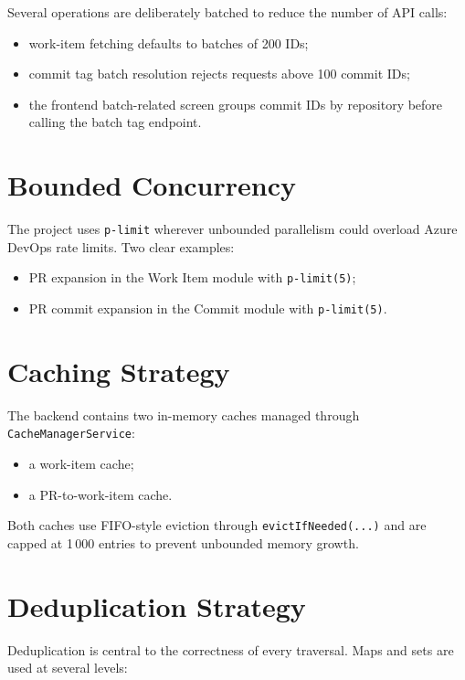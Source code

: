 \documentclass[12pt,a4paper]{report}
\newcommand{\code}[1]{\texttt{\small\color{codered}#1}}
\begin{document}
Several operations are deliberately batched to reduce the number of API calls:

\begin{itemize}
  \item work-item fetching defaults to batches of 200 IDs;
  \item commit tag batch resolution rejects requests above 100 commit IDs;
  \item the frontend batch-related screen groups commit IDs by repository before calling the batch tag endpoint.
\end{itemize}

\section{Bounded Concurrency}

The project uses \code{p-limit} wherever unbounded parallelism could overload
Azure DevOps rate limits. Two clear examples:

\begin{itemize}
  \item PR expansion in the Work Item module with \code{p-limit(5)};
  \item PR commit expansion in the Commit module with \code{p-limit(5)}.
\end{itemize}

\section{Caching Strategy}

The backend contains two in-memory caches managed through \code{CacheManagerService}:

\begin{itemize}
  \item a work-item cache;
  \item a PR-to-work-item cache.
\end{itemize}

Both caches use FIFO-style eviction through \code{evictIfNeeded(...)} and are
capped at 1\,000 entries to prevent unbounded memory growth.

\section{Deduplication Strategy}

Deduplication is central to the correctness of every traversal. Maps and sets
are used at several levels:
\end{document}
